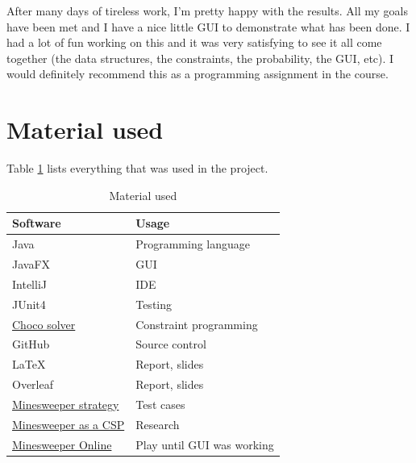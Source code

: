 \documentclass[11pt,a4paper,notitlepage]{article}
\theoremstyle{definition}
\begin{document}
After many days of tireless work, I'm pretty happy with the results. All my goals have been met and I have a nice little GUI to demonstrate what has been done. I had a lot of fun working on this and it was very satisfying to see it all come together (the data structures, the constraints, the probability, the GUI, etc). I would definitely recommend this as a programming assignment in the course.

\newpage
\appendix
\section{Material used}
Table \ref{table:soft} lists everything that was used in the project.
\begin{table}[H]
\begin{center}
\begin{tabular}{l|l}
Software & Usage \\
\hline
Java & Programming language \\
JavaFX & GUI \\
IntelliJ & IDE \\
JUnit4 & Testing \\
\href{http://www.choco-solver.org/}{Choco solver} & Constraint programming \\
GitHub & Source control \\
\LaTeX{} & Report, slides \\
Overleaf & Report, slides \\
\href{http://www.minesweeper.info/wiki/Strategy}{Minesweeper strategy} & Test cases \\
\href{http://www.cs.toronto.edu/~cvs/minesweeper/minesweeper.pdf}{Minesweeper as a CSP} & Research \\
\href{http://minesweeperonline.com/}{Minesweeper Online} & Play until GUI was working
\end{tabular}
\end{center}
\caption{Material used}
\label{table:soft}
\end{table}
\end{document}
